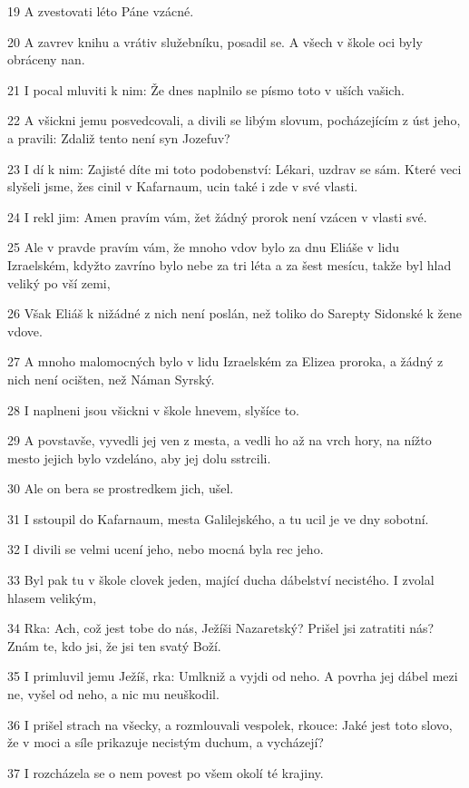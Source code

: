 \par 19 A zvestovati léto Páne vzácné.
\par 20 A zavrev knihu a vrátiv služebníku, posadil se. A všech v škole oci byly obráceny nan.
\par 21 I pocal mluviti k nim: Že dnes naplnilo se písmo toto v uších vašich.
\par 22 A všickni jemu posvedcovali, a divili se libým slovum, pocházejícím z úst jeho, a pravili: Zdaliž tento není syn Jozefuv?
\par 23 I dí k nim: Zajisté díte mi toto podobenství: Lékari, uzdrav se sám. Které veci slyšeli jsme, žes cinil v Kafarnaum, ucin také i zde v své vlasti.
\par 24 I rekl jim: Amen pravím vám, žet žádný prorok není vzácen v vlasti své.
\par 25 Ale v pravde pravím vám, že mnoho vdov bylo za dnu Eliáše v lidu Izraelském, kdyžto zavríno bylo nebe za tri léta a za šest mesícu, takže byl hlad veliký po vší zemi,
\par 26 Však Eliáš k nižádné z nich není poslán, než toliko do Sarepty Sidonské k žene vdove.
\par 27 A mnoho malomocných bylo v lidu Izraelském za Elizea proroka, a žádný z nich není ocišten, než Náman Syrský.
\par 28 I naplneni jsou všickni v škole hnevem, slyšíce to.
\par 29 A povstavše, vyvedli jej ven z mesta, a vedli ho až na vrch hory, na nížto mesto jejich bylo vzdeláno, aby jej dolu sstrcili.
\par 30 Ale on bera se prostredkem jich, ušel.
\par 31 I sstoupil do Kafarnaum, mesta Galilejského, a tu ucil je ve dny sobotní.
\par 32 I divili se velmi ucení jeho, nebo mocná byla rec jeho.
\par 33 Byl pak tu v škole clovek jeden, mající ducha dábelství necistého. I zvolal hlasem velikým,
\par 34 Rka: Ach, což jest tobe do nás, Ježíši Nazaretský? Prišel jsi zatratiti nás? Znám te, kdo jsi, že jsi ten svatý Boží.
\par 35 I primluvil jemu Ježíš, rka: Umlkniž a vyjdi od neho. A povrha jej dábel mezi ne, vyšel od neho, a nic mu neuškodil.
\par 36 I prišel strach na všecky, a rozmlouvali vespolek, rkouce: Jaké jest toto slovo, že v moci a síle prikazuje necistým duchum, a vycházejí?
\par 37 I rozcházela se o nem povest po všem okolí té krajiny.
